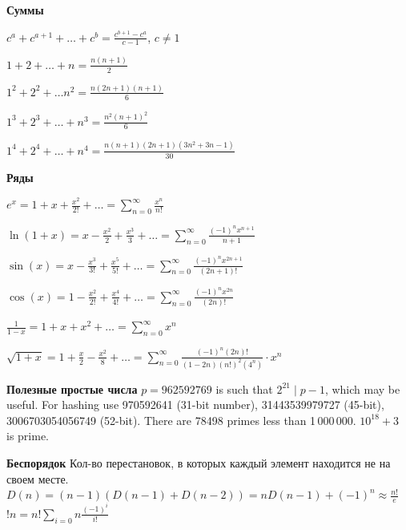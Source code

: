 \textbf{Суммы}

$
c^a + c^{a + 1} + \ldots + c^{b} = \frac{c^{b + 1} - c^{a}}{c - 1}
$, $c \neq 1$

$1 + 2 + \ldots + n = \frac{n(n + 1)}{2}$

$1^2 + 2^2 + \ldots n^2 = \frac{n(2n + 1)(n + 1)}{6}$

$1^3 + 2^3 + \ldots + n^3 = \frac{n^2(n + 1)^2}{6}$

$1^4 + 2^4 + \ldots + n^4 = \frac{n(n + 1)(2n + 1)(3n^2 + 3n - 1)}{30}$

\textbf{Ряды}

$e^x = 1 + x + \frac{x^2}{2!} + \ldots 
= \sum_{n=0}^{\infty}\frac{x^n}{n!}$

$\ln(1 + x) = x - \frac{x^2}{2} + \frac{x^3}{3} + \ldots 
= \sum_{n = 0}^{\infty}\frac{(-1)^n x^{n + 1}}{n + 1}$

$\sin(x) = x - \frac{x^3}{3!} + \frac{x^5}{5!} + \ldots
= \sum_{n = 0}^{\infty}\frac{(-1)^n x^{2n + 1}}{(2n + 1)!}$

$\cos(x) = 1 - \frac{x^2}{2!} + \frac{x^4}{4!} + \ldots
= \sum_{n = 0}^{\infty}\frac{(-1)^n x^{2n}}{(2n)!}$

$\frac{1}{1 - x} = 1 + x + x^2 + \ldots 
= \sum_{n = 0}^{\infty}x^n$

$\sqrt{1 + x} = 1 + \frac{x}{2} - \frac{x^2}{8} + \ldots
= \sum_{n = 0}^{\infty}\frac{(-1)^n (2n)!}{(1 - 2n)(n!)^2(4^n)} \cdot x^n$

\textbf{Полезные простые числа}
$p=962592769$ is such that $2^{21} \mid p-1$, which may be useful. For hashing
use 970592641 (31-bit number), 31443539979727 (45-bit), 3006703054056749
(52-bit). There are 78498 primes less than 1\,000\,000.
$10^18 + 3$ is prime.

\textbf{Беспорядок}
Кол-во перестановок, в которых каждый элемент находится не на своем месте.
$D(n) = (n - 1)(D(n - 1) + D(n - 2)) = nD(n - 1) + (-1)^n \approx \frac{n!}{e}$
$!n = n!\sum_{i = 0}{n}\frac{(-1)^i}{i!}$